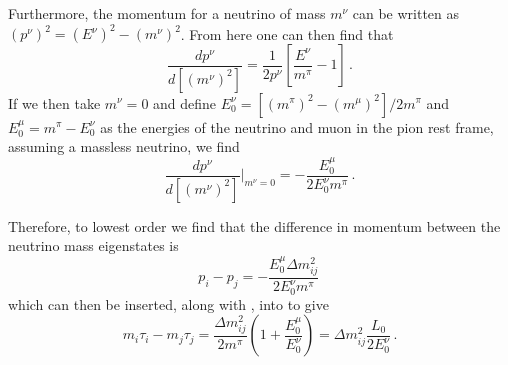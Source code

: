 Furthermore, the momentum for a neutrino of mass $m^{\nu}$ can be written as $(p^{\nu})^{2} = (E^{\nu})^{2} - (m^{\nu})^{2}$.
From here one can then find that
\begin{equation}
  \frac{ dp^{\nu} }{ d[(m^{\nu})^{2}] } = \frac{ 1 }{ 2p^{\nu} } \left[ \frac{ E^{\nu}}{ m^{\pi} } - 1 \right] \, .
\end{equation}
If we then take $m^{\nu} = 0$ and define $E_{0}^{\nu} = [(m^{\pi})^{2} - (m^{\mu})^{2}]/2m^{\pi}$ and $E_{0}^{\mu} = m^{\pi} - E_{0}^{\nu}$ as the energies of the neutrino and muon in the pion rest frame, assuming a massless neutrino, we find
\begin{equation}
  \frac{ dp^{\nu} }{ d[(m^{\nu})^{2}] }\bigg|_{m^{\nu}=0} = -\frac{ E^{\mu}_{0} }{ 2E^{\nu}_{0}m^{\pi} } \, .
\end{equation}

Therefore, to lowest order we find that the difference in momentum between the neutrino mass eigenstates is
\begin{equation}
  p_{i} - p_{j} = -\frac{ E^{\mu}_{0} \Delta m_{ij}^{2} }{ 2E^{\nu}_{0}m^{\pi} } \, 
\end{equation}
which can then be inserted, along with , into  to give
\begin{equation}
  m_{i}\tau_{i} - m_{j}\tau_{j} = \frac{ \Delta m_{ij}^{2} }{ 2m^{\pi} }\left(1 + \frac{ E_{0}^{\mu} }{ E_{0}^{\nu} } \right) = \Delta m_{ij}^{2} \frac{L_{0}}{2E_{0}^{\nu}} \, .
\end{equation}

